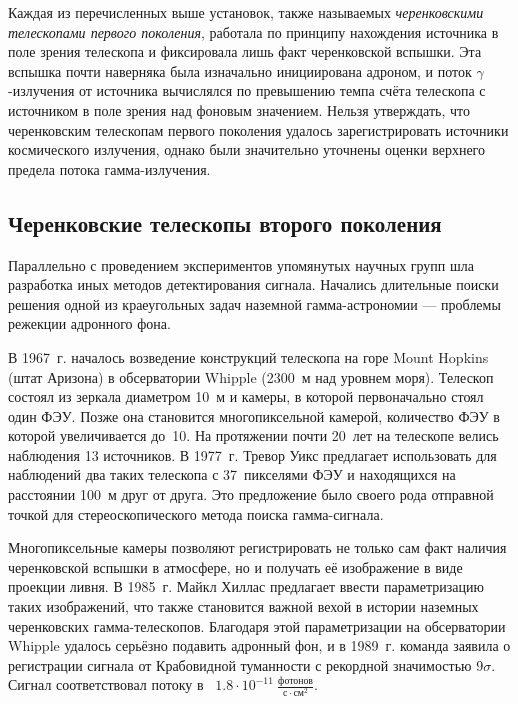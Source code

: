 \documentclass[magd,floatypics,numeref]{msudipl} %
\begin{document}
Каждая из перечисленных выше установок, также называемых \textit{черенковскими телескопами первого поколения}, работала по принципу нахождения источника в поле зрения телескопа и фиксировала лишь факт черенковской вспышки. Эта вспышка почти наверняка была изначально инициирована адроном, и поток $\gamma$-излучения от источника вычислялся по превышению темпа счёта телескопа с источником в поле зрения над фоновым значением.  Нельзя утверждать, что черенковским телескопам первого поколения удалось зарегистрировать источники космического излучения, однако были значительно уточнены оценки верхнего предела потока гамма-излучения.
\subsection{Черенковские телескопы второго поколения}
Параллельно с проведением экспериментов упомянутых научных групп шла разработка иных методов детектирования сигнала. Начались длительные поиски решения одной из краеугольных задач наземной гамма-астрономии --- проблемы режекции адронного фона. 

В 1967~г. началось возведение конструкций телескопа на горе Mount Hopkins (штат Аризона) в обсерватории Whipple (2300~м над уровнем моря). Телескоп состоял из зеркала диаметром 10~м и камеры, в которой первоначально стоял один ФЭУ. Позже она становится многопиксельной камерой, количество ФЭУ в которой увеличивается до~10. На протяжении почти 20~лет на телескопе велись наблюдения 13 источников. В 1977~г. Тревор Уикс предлагает использовать для наблюдений два таких телескопа с 37~пикселями ФЭУ и находящихся на расстоянии 100~м друг от друга. Это предложение было своего рода отправной точкой для стереоскопического метода поиска гамма-сигнала. 

Многопиксельные камеры позволяют регистрировать не только сам факт наличия черенковской вспышки в атмосфере, но и получать её изображение в виде проекции ливня. В 1985~г. Майкл Хиллас предлагает ввести параметризацию таких изображений, что также становится важной вехой в истории наземных черенковских гамма-телескопов. Благодаря этой параметризации на обсерватории Whipple удалось серьёзно подавить адронный фон, и в 1989~г. команда заявила о регистрации сигнала от Крабовидной туманности с рекордной значимостью $9\sigma$. Сигнал соответствовал потоку в~ $1.8\cdot10^{-11}~\frac{\text{фотонов}}{\text{с}\cdot\text{см}^2}$. 
\end{document}
